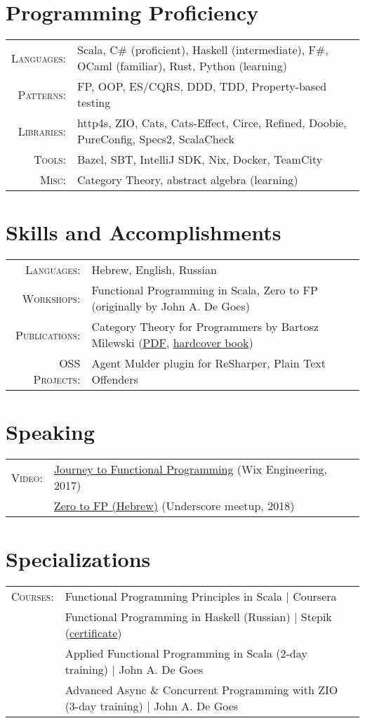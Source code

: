 \documentclass[a4paper,11pt]{article}
\begin{document}
\section{Programming Proficiency}
\begin{tabular}{rl}
  \textsc{Languages:}& Scala, C\# (proficient), Haskell (intermediate), F\#, OCaml (familiar), Rust, Python (learning)\\
  \textsc{Patterns:}& FP, OOP, ES/CQRS, DDD, TDD, Property-based testing\\
  \textsc{Libraries:}& http4s, ZIO, Cats, Cats-Effect, Circe, Refined, Doobie, PureConfig, Specs2, ScalaCheck\\
  \textsc{Tools:}& Bazel, SBT, IntelliJ SDK, Nix, Docker, TeamCity\\
  \textsc{Misc:}& Category Theory, abstract algebra (learning)
\end{tabular}

\section{Skills and Accomplishments}
\begin{tabular}{rl}
  \textsc{Languages:}& Hebrew, English, Russian\\
  \textsc{Workshops:}& Functional Programming in Scala, Zero to FP (originally by John A. De Goes)\\
  \textsc{Publications:}& Category Theory for Programmers by Bartosz Milewski (\href{https://github.com/hmemcpy/milewski-ctfp-pdf}{PDF}, \href{https://www.blurb.com/b/9621951-category-theory-for-programmers-new-edition-hardco}{hardcover book})\\
  \textsc{OSS Projects:}& Agent Mulder plugin for ReSharper, Plain Text Offenders\\
\end{tabular}

\section{Speaking}
\begin{tabular}{rl}
  \textsc{Video:}&\href{https://www.youtube.com/watch?v=g1EvM4CbUvM}{Journey to Functional Programming} (Wix Engineering, 2017)\\
  &\href{https://www.youtube.com/watch?v=N6ZJwnvTjLA}{Zero to FP (Hebrew)} (Underscore meetup, 2018)\\
\end{tabular}

\section{Specializations}
\begin{tabular}{rl}
  \textsc{Courses:}
  &Functional Programming Principles in Scala | Coursera\\
  &Functional Programming in Haskell (Russian) | Stepik (\href{https://stepik.org/cert/13318}{certificate})\\
  &Applied Functional Programming in Scala (2-day training) | John A. De Goes\\
  &Advanced Async \& Concurrent Programming with ZIO (3-day training) | John A. De Goes
\end{tabular}
\end{document}
